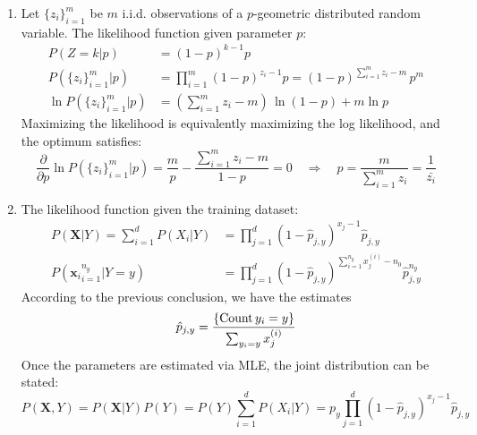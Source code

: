 \documentclass[a4paper, 10pt]{article}
\begin{document}
\begin{enumerate}[label=(\alph*)]
    \item Let $\{z_i\}_{i=1}^m$ be $m$ i.i.d. observations of a $p$-geometric distributed random variable. The likelihood function given parameter $p$:
    \begin{equation}
        \begin{aligned}
            P\left(Z=k|p\right) &= (1 - p)^{k-1} p \\
            P\left(\{z_i\}_{i=1}^m | p\right) &= \prod_{i=1}^m (1 - p)^{z_i-1} p = (1 - p)^{\sum_{i=1}^m z_i - m} \, p^m \\
            \ln P\left(\{z_i\}_{i=1}^m | p\right) &= \left(\sum_{i=1}^m z_i - m\right) \, \ln (1 - p) + m \ln p
        \end{aligned}
    \end{equation}
    Maximizing the likelihood is equivalently maximizing the log likelihood, and the optimum satisfies:
    \begin{equation}
        \frac{\partial}{\partial p} \ln P\left(\{z_i\}_{i=1}^m | p\right) = \frac{m}{p} - \frac{\sum_{i=1}^m z_i - m}{1 - p} = 0 \quad \Longrightarrow \quad p = \frac{m}{\sum_{i=1}^m z_i} = \frac{1}{\bar{z_i}}
    \end{equation}

    \item The likelihood function given the training dataset:
    \begin{equation}
        \begin{aligned}
            P(\mathbf{X}|Y) = \sum_{i=1}^d P(X_i | Y) &= \prod_{j=1}^d \left(1 - \hat{p}_{j,y}\right)^{x_j - 1} \hat{p}_{j,y} \\ 
            P({\mathbf{x}_i}_{i=1}^{n_y} | Y = y) &= \prod_{j=1}^d \left(1 - \hat{p}_{j,y}\right)^{\sum_{i=1}^{n_y} x^{(i)}_j - n_0} \hat{p}_{j,y}^{n_y}
        \end{aligned}
    \end{equation}
    According to the previous conclusion, we have the estimates
    \begin{equation}
        \hat{p}_{j,y} = \frac{\{{\rm Count} \, y_i=y\}}{\sum_{y_i = y} x^{(i)}_j}
    \end{equation}
    Once the parameters are estimated via MLE, the joint distribution can be stated:
    \begin{equation}
        P(\mathbf{X}, Y) = P(\mathbf{X} | Y) P(Y) = P(Y) \sum_{i=1}^d P(X_i | Y) = p_y \prod_{j=1}^d \left(1 - \hat{p}_{j,y}\right)^{x_j - 1} \hat{p}_{j,y}
    \end{equation}


\end{enumerate}
\end{document}
